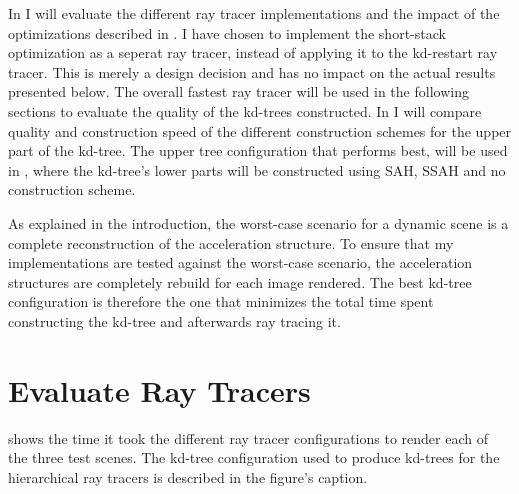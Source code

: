 
In  I will evaluate the different ray tracer
implementations and the impact of the optimizations described in
. I have chosen to implement the
short-stack optimization as a seperat ray tracer, instead of applying it to the
kd-restart ray tracer. This is merely a design decision and has no impact on the
actual results presented below. The overall fastest ray tracer will be used in
the following sections to evaluate the quality of the kd-trees constructed. In
 I will compare quality and construction speed
of the different construction schemes for the upper part of the kd-tree. The
upper tree configuration that performs best, will be used in
, where the kd-tree's lower parts will be
constructed using SAH, SSAH and no construction scheme.

As explained in the introduction, the worst-case scenario for a dynamic scene is
a complete reconstruction of the acceleration structure. To ensure that my
implementations are tested against the worst-case scenario, the acceleration
structures are completely rebuild for each image rendered. The best kd-tree
configuration is therefore the one that minimizes the total time spent
constructing the kd-tree and afterwards ray tracing it.


\section{Evaluate Ray Tracers}\label{sec:evaluateRayTracer}

 shows the time it took the different ray tracer
configurations to render each of the three test scenes. The kd-tree
configuration used to produce kd-trees for the hierarchical ray tracers is
described in the figure's caption.

\newcommand{\tabelMoeller}{
  \begin{tabular}{c}
    Moeller- \\ Trumbore
  \end{tabular}
}


